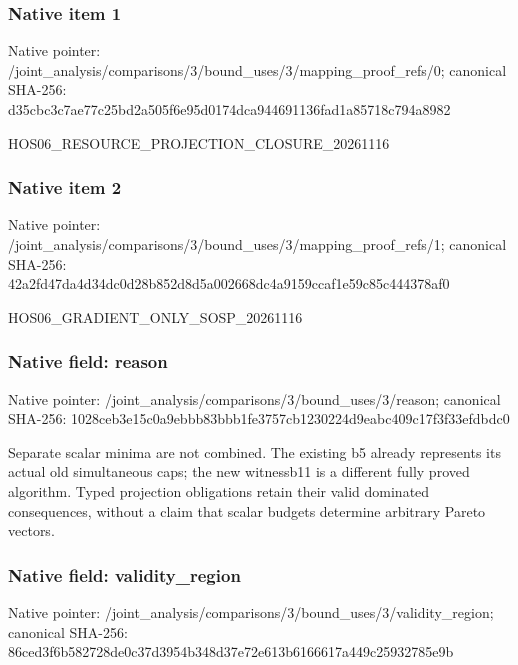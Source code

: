 \documentclass[10pt,a4paper]{article}
\begin{document}
\subsubsection{Native item 1}
Native pointer: /joint\_\allowbreak{}analysis/comparisons/3/bound\_\allowbreak{}uses/3/mapping\_\allowbreak{}proof\_\allowbreak{}refs/0; canonical SHA-256: d35cbc3c7ae77c25bd2a505f6e95d0174dca944691136fad1a85718c794a8982

\begingroup\raggedright\sloppy HOS06\_\allowbreak{}RESOURCE\_\allowbreak{}PROJECTION\_\allowbreak{}CLOSURE\_\allowbreak{}20261116\par\endgroup

\subsubsection{Native item 2}
Native pointer: /joint\_\allowbreak{}analysis/comparisons/3/bound\_\allowbreak{}uses/3/mapping\_\allowbreak{}proof\_\allowbreak{}refs/1; canonical SHA-256: 42a2fd47da4d34dc0d28b852d8d5a002668dc4a9159ccaf1e59c85c444378af0

\begingroup\raggedright\sloppy HOS06\_\allowbreak{}GRADIENT\_\allowbreak{}ONLY\_\allowbreak{}SOSP\_\allowbreak{}20261116\par\endgroup

\subsubsection{Native field: reason}
Native pointer: /joint\_\allowbreak{}analysis/comparisons/3/bound\_\allowbreak{}uses/3/reason; canonical SHA-256: 1028ceb3e15c0a9ebbb83bbb1fe3757cb1230224d9eabc409c17f3f33efdbdc0

\begingroup\raggedright\sloppy Separate scalar minima are not combined. The existing b5 already represents its actual old simultaneous caps;\allowbreak{} the new witnessb11 is a different fully proved algorithm. Typed projection obligations retain their valid dominated consequences,\allowbreak{} without a claim that scalar budgets determine arbitrary Pareto vectors.\par\endgroup

\subsubsection{Native field: validity\_\allowbreak{}region}
Native pointer: /joint\_\allowbreak{}analysis/comparisons/3/bound\_\allowbreak{}uses/3/validity\_\allowbreak{}region; canonical SHA-256: 86ced3f6b582728de0c37d3954b348d37e72e613b6166617a449c25932785e9b
\end{document}
